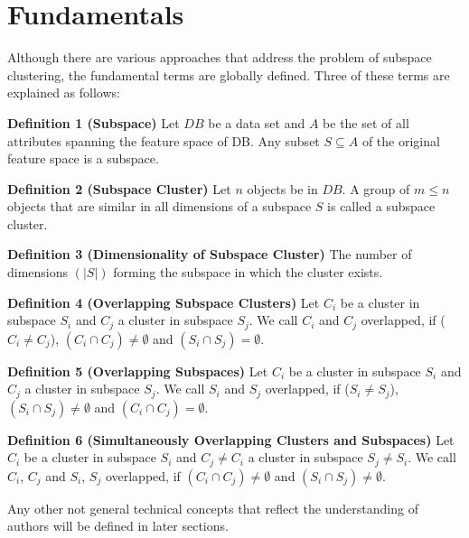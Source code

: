 \section{Fundamentals}\raggedbottom

Although there are various approaches that address the problem of subspace clustering, the fundamental terms are globally defined. Three of these terms are explained as follows:

\textbf{Definition 1 (Subspace)} Let $DB$ be a data set and $A$ be the set of all attributes spanning the feature space of DB. Any subset $S \subseteq A$ of the original feature space is a subspace. 

\textbf{Definition 2 (Subspace Cluster)} Let $n$ objects be in $DB$. A group of $m \leq n $ objects that are similar in all dimensions of a subspace $S$ is called a subspace cluster. 

\textbf{Definition 3 (Dimensionality of Subspace Cluster)} The number of dimensions $(|S|)$ forming the subspace in which the cluster exists.

\textbf{Definition 4 (Overlapping Subspace Clusters)} Let $C_{i}$ be a cluster in subspace $S_{i}$ and $C_{j}$ a cluster in subspace $S_{j}$. We call $C_{i}$ and $C_{j}$ overlapped, if ($C_{i} \neq C_{j}$), $(C_{i} \cap C_{j}) \neq \emptyset$ and $(S_{i} \cap S_{j}) = \emptyset$.

\textbf{Definition 5 (Overlapping Subspaces)} Let $C_{i}$ be a cluster in subspace $S_{i}$ and $C_{j}$ a cluster in subspace $S_{j}$. We call $S_{i}$ and $S_{j}$ overlapped, if ($S_{i} \neq S_{j}$), $(S_{i} \cap S_{j}) \neq \emptyset$ and $(C_{i} \cap C_{j}) = \emptyset$.

\textbf{Definition 6 (Simultaneously Overlapping Clusters and Subspaces)} Let $C_{i}$ be a cluster in subspace $S_{i}$ and $C_{j} \neq C_{i}$ a cluster in subspace $S_{j} \neq S_{i}$. We call $C_{i}$, $C_{j}$ and $S_{i}$, $S_{j}$ overlapped, if $(C_{i} \cap C_{j}) \neq \emptyset$ and $(S_{i} \cap S_{j}) \neq \emptyset$.

Any other not general technical concepts that reflect the understanding of authors will be defined in later sections.